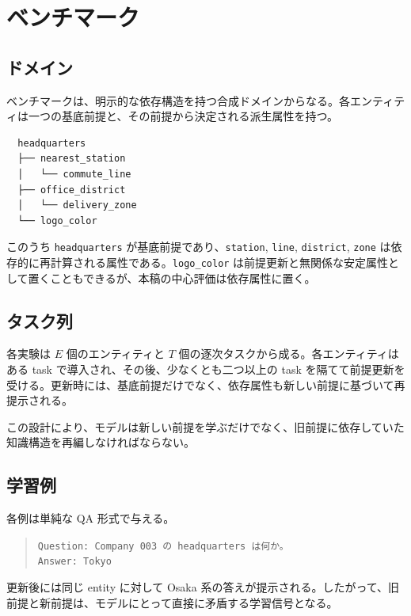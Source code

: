 \documentclass[12pt,a4paper]{article}
\begin{document}
\section{ベンチマーク}

\subsection{ドメイン}

ベンチマークは、明示的な依存構造を持つ合成ドメインからなる。各エンティティは一つの基底前提と、その前提から決定される派生属性を持つ。

\begin{verbatim}
  headquarters
  ├── nearest_station
  │   └── commute_line
  ├── office_district
  │   └── delivery_zone
  └── logo_color
\end{verbatim}

このうち \texttt{headquarters} が基底前提であり、\texttt{station}, \texttt{line}, \texttt{district}, \texttt{zone} は依存的に再計算される属性である。\texttt{logo\_color} は前提更新と無関係な安定属性として置くこともできるが、本稿の中心評価は依存属性に置く。

\subsection{タスク列}

各実験は $E$ 個のエンティティと $T$ 個の逐次タスクから成る。各エンティティはある task で導入され、その後、少なくとも二つ以上の task を隔てて前提更新を受ける。更新時には、基底前提だけでなく、依存属性も新しい前提に基づいて再提示される。

この設計により、モデルは新しい前提を学ぶだけでなく、旧前提に依存していた知識構造を再編しなければならない。

\subsection{学習例}

各例は単純な QA 形式で与える。

\begin{quote}
\texttt{Question: Company 003 の headquarters は何か。} \\
\texttt{Answer: Tokyo}
\end{quote}

更新後には同じ entity に対して Osaka 系の答えが提示される。したがって、旧前提と新前提は、モデルにとって直接に矛盾する学習信号となる。
\end{document}
